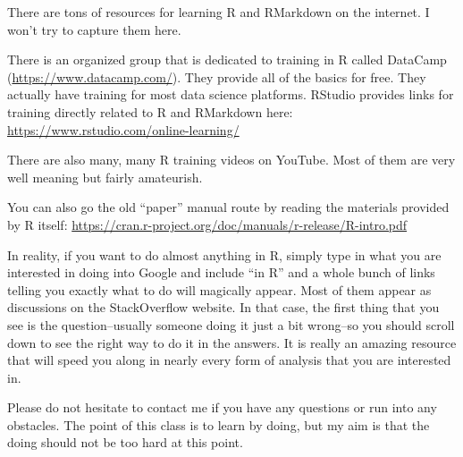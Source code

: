\documentclass[]{book}
\begin{document}
There are tons of resources for learning R and RMarkdown on the internet. I won't try to capture them here.

There is an organized group that is dedicated to training in R called DataCamp (\url{https://www.datacamp.com/}). They provide all of the basics for free. They actually have training for most data science platforms. RStudio provides links for training directly related to R and RMarkdown here:
\url{https://www.rstudio.com/online-learning/}

There are also many, many R training videos on YouTube. Most of them are very well meaning but fairly amateurish.

You can also go the old ``paper'' manual route by reading the materials provided by R itself:
\url{https://cran.r-project.org/doc/manuals/r-release/R-intro.pdf}

In reality, if you want to do almost anything in R, simply type in what you are interested in doing into Google and include ``in R'' and a whole bunch of links telling you exactly what to do will magically appear. Most of them appear as discussions on the StackOverflow website. In that case, the first thing that you see is the question--usually someone doing it just a bit wrong--so you should scroll down to see the right way to do it in the answers. It is really an amazing resource that will speed you along in nearly every form of analysis that you are interested in.

Please do not hesitate to contact me if you have any questions or run into any obstacles. The point of this class is to learn by doing, but my aim is that the doing should not be too hard at this point.


\end{document}
